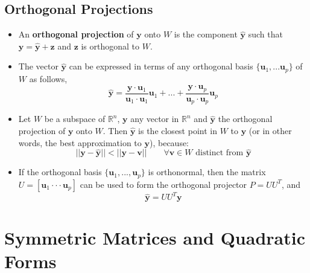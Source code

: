 \documentclass[11pt]{article}
\begin{document}
\subsection{Orthogonal Projections}
\begin{itemize}
\item An \textbf{orthogonal projection} of $\mathbf{y}$ onto $W$ is the component $\mathbf{\hat{y}}$ such that $\mathbf{y} = \mathbf{\hat{y}}+\mathbf{z}$ and $\mathbf{z}$ is orthogonal to $W$.
\item The vector $\mathbf{\hat{y}}$ can be expressed in terms of any orthogonal basis $\{\mathbf{u}_1,...\mathbf{u}_p\}$ of $W$ as follows,
$$\mathbf{\hat{y}} = \frac{\mathbf{y} \cdot \mathbf{u}_1}{\mathbf{u}_1 \cdot \mathbf{u}_1} \mathbf{u}_1 + ... + \frac{\mathbf{y} \cdot \mathbf{u}_p}{\mathbf{u}_p \cdot \mathbf{u}_p} \mathbf{u}_p$$
\item Let $W$ be a subspace of $\mathbb{R}^n$, $\mathbf{y}$ any vector in $\mathbb{R}^n$ and $\mathbf{\hat{y}}$ the orthogonal projection of $\mathbf{y}$ onto $W$. Then $\mathbf{\hat{y}}$ is the closest point in $W$ to $\mathbf{y}$ (or in other words, the best approximation to $\mathbf{y}$), because:
$$||\mathbf{y}-\mathbf{\hat{y}}|| < ||\mathbf{y}-\mathbf{v}||\qquad \forall \mathbf{v} \in W \text{ distinct from }\mathbf{\hat{y}}$$
\item If the orthogonal basis $\{\mathbf{u}_1,...,\mathbf{u}_p\}$ is orthonormal, then the matrix $U=[\mathbf{u}_1 \cdot\cdot\cdot \mathbf{u}_p]$ can be used to form the orthogonal projector $P=UU^T$, and
$$\mathbf{\hat{y}}=UU^T\mathbf{y}$$
\end{itemize}  
\section{Symmetric Matrices and Quadratic Forms}

\end{document}
